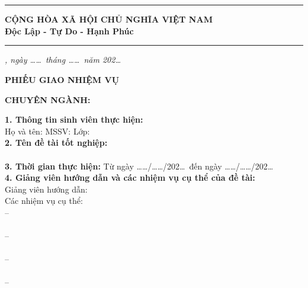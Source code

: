 \clearpage
{}
{}
\enlargethispage{1.5cm}

\begin{center}
\vspace*{-1.0cm}
\begin{minipage}[t]{0.48\textwidth}
\centering
{\fontsize{10pt}{12pt}\selectfont \textbf{\tentruong}} \\
{\fontsize{10pt}{12pt}\selectfont \bfseries \tenkhoa} \\
\rule{2.2cm}{0.4pt}
\end{minipage}
\hfill
\begin{minipage}[t]{0.48\textwidth}
\centering
{\fontsize{10pt}{12pt}\selectfont \bfseries CỘNG HÒA XÃ HỘI CHỦ NGHĨA VIỆT NAM} \\
{\fontsize{10pt}{12pt}\selectfont \bfseries Độc Lập - Tự Do - Hạnh Phúc} \\
\rule{2.2cm}{0.4pt}
\end{minipage}

\vspace{0.15cm}
\hfill \textit{\thanhpho, ngày \dots\dots\ tháng \dots\dots\ năm 202\dots}

\vspace{0.2cm}
{\fontsize{13pt}{16pt}\selectfont \bfseries PHIẾU GIAO NHIỆM VỤ\par}
\vspace{0.05cm}
{\fontsize{11pt}{13pt}\selectfont \bfseries \loaihinhdoan\par}
\vspace{0.05cm}
{\fontsize{10.5pt}{12.5pt}\selectfont \bfseries CHUYÊN NGÀNH: \tenchuyennganh\par}
\vspace{0.2cm}
\end{center}

\begingroup
\fontsize{10.5pt}{13.5pt}\selectfont
\noindent \textbf{1. Thông tin sinh viên thực hiện:} \\
Họ và tên: \textbf{\sinhvien} \hfill MSSV: \textbf{\mssv} \hfill Lớp: \textbf{\lop} \\[0.1cm]
\noindent \textbf{2. Tên đề tài tốt nghiệp:} \\
\textbf{\tendetai} \\[0.1cm]
\noindent \textbf{3. Thời gian thực hiện:} Từ ngày \dots\dots/\dots\dots/202\dots\ đến ngày \dots\dots/\dots\dots/202\dots \\[0.1cm]
\noindent \textbf{4. Giảng viên hướng dẫn và các nhiệm vụ cụ thể của đề tài:} \\
Giảng viên hướng dẫn: \textbf{\nguoihuongdan} \\[0.1cm]
Các nhiệm vụ cụ thể: \\
\noindent -- \dotfill \\[0.25cm]
\noindent \phantom{--} \dotfill \\[0.25cm]
\noindent -- \dotfill \\[0.25cm]
\noindent \phantom{--} \dotfill \\[0.25cm]
\noindent -- \dotfill \\[0.25cm]
\noindent \phantom{--} \dotfill \\[0.25cm]
\noindent -- \dotfill \\[0.25cm]
\noindent \phantom{--} \dotfill

